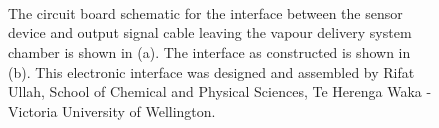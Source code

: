 \documentclass[
  a4paper,
]{scrbook}
\begin{document}
\begin{figure}
\begin{minipage}[t]{0.91\linewidth}
{}

\end{minipage}%
%
\begin{minipage}[t]{0.03\linewidth}

{\centering 

~

}

\end{minipage}%
\newline
\begin{minipage}[t]{0.03\linewidth}

{\centering 


}

\end{minipage}%
%
\begin{minipage}[t]{0.03\linewidth}

{\centering 

~

}

\end{minipage}%
%
\begin{minipage}[t]{0.91\linewidth}

{\centering 


}

\end{minipage}%
%
\begin{minipage}[t]{0.03\linewidth}

{\centering 

~

}

\end{minipage}%

\caption[The circuit board schematic for the interface between the
sensor device and output signal cable leaving the vapour delivery system
chamber, alongside the interface as
constructed.]{\label{fig-device-interface}The circuit board schematic
for the interface between the sensor device and output signal cable
leaving the vapour delivery system chamber is shown in (a). The
interface as constructed is shown in (b). This electronic interface was
designed and assembled by Rifat Ullah, School of Chemical and Physical
Sciences, Te Herenga Waka - Victoria University of Wellington.}

\end{figure}
\end{document}

